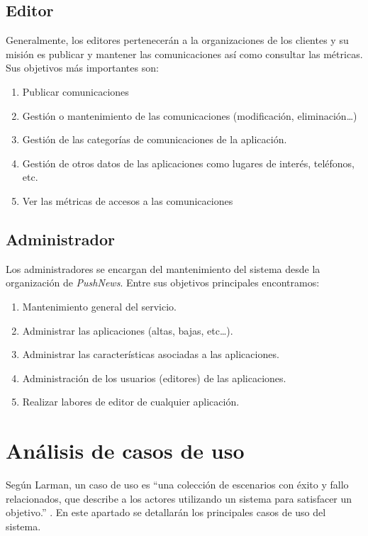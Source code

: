 \subsection{Editor}
Generalmente, los editores pertenecerán a la organizaciones de los clientes y su misión es publicar y mantener las comunicaciones así como consultar las métricas. Sus objetivos más importantes son:
\begin{enumerate}
    \item Publicar comunicaciones
    \item Gestión o mantenimiento de las comunicaciones (modificación, eliminación\dots)
    \item Gestión de las categorías de comunicaciones de la aplicación.
    \item Gestión de otros datos de las aplicaciones como lugares de interés, teléfonos, etc.
    \item Ver las métricas de accesos a las comunicaciones
\end{enumerate}

\subsection{Administrador}
Los administradores se encargan del mantenimiento del sistema desde la organización de \emph{PushNews}. Entre sus objetivos principales encontramos:
\begin{enumerate}
    \item Mantenimiento general del servicio.
    \item Administrar las aplicaciones (altas, bajas, etc\dots).
    \item Administrar las características asociadas a las aplicaciones.
    \item Administración de los usuarios (editores) de las aplicaciones. 
    \item Realizar labores de editor de cualquier aplicación.
\end{enumerate}

\section{Análisis de casos de uso}
Según Larman, un caso de uso es ``una colección de escenarios con éxito y fallo relacionados, que describe a los actores utilizando un sistema para satisfacer un objetivo.'' \cite{Larman2004}. En este apartado se detallarán los principales casos de uso del sistema.

